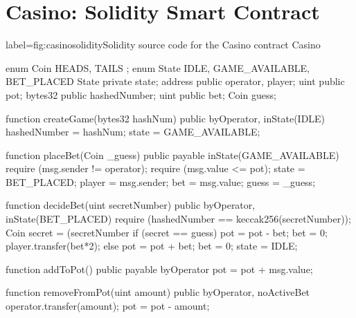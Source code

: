 \documentclass[a4paper,UKenglish,cleveref, autoref, thm-restate]{oasics-v2021}
\begin{document}
\appendix

\section{Casino: Solidity Smart Contract}\label{sec:app1}

\begin{code}{label={fig:casino}}{solidity}{Solidity source code for the Casino}
	contract Casino {
		enum Coin { HEADS, TAILS } ;
		enum State { IDLE, GAME_AVAILABLE,  BET_PLACED }
		State private state; 
		address public operator, player;
		uint public pot;
		bytes32 public hashedNumber;
		uint public bet;
		Coin guess;

		function createGame(bytes32 hashNum) 
			public byOperator, inState(IDLE) { 
			hashedNumber = hashNum; 
			state = GAME_AVAILABLE;
		}

		function placeBet(Coin _guess) public payable inState(GAME_AVAILABLE) {
			require (msg.sender != operator);
			require (msg.value <= pot);
			state = BET_PLACED; 
			player = msg.sender; 
			bet = msg.value; 
			guess = _guess; 
		}

 		function decideBet(uint secretNumber) 
		public byOperator, inState(BET_PLACED) { 
			require (hashedNumber == keccak256(secretNumber)); 
			Coin secret = (secretNumber %
			if (secret == guess) {
				pot = pot - bet;  
				bet = 0;
        player.transfer(bet*2);
      }	else {
				pot = pot + bet; 
				bet = 0;
			}
			state = IDLE;
    }
		
    function addToPot() public payable byOperator {
      pot = pot + msg.value;
    }

		function removeFromPot(uint amount) public byOperator, noActiveBet { 
			operator.transfer(amount);  
			pot = pot - amount;
    }
	}
\end{code}
\end{document}
